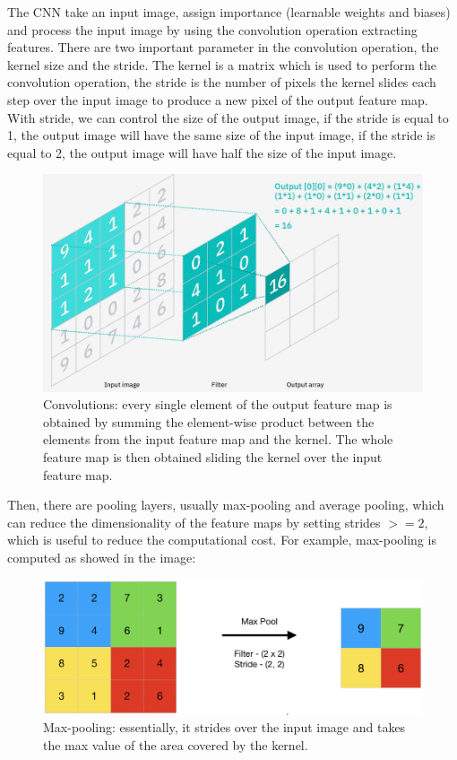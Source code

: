 The CNN take an input image, assign importance (learnable weights and biases) and process the input image by using the convolution operation extracting features.
There are two important parameter in the convolution operation, the kernel size and the stride.
The kernel is a matrix which is used to perform the convolution operation, the stride is the number of pixels the kernel slides each step over the input image to produce a new pixel of the output feature map.
With stride, we can control the size of the output image, if the stride is equal to 1, the output image will have the same size of the input image, if the stride is equal to 2, the output image will have half the size of the input image.
\begin{figure}[H]
    \centering
    \includegraphics[width=\textwidth]{images/2_convolutions}
    \caption{Convolutions: every single element of the output feature map is obtained by summing the element-wise product between the elements from the input feature map and the kernel. The whole feature map is then obtained sliding the kernel over the input feature map.}
    \label{fig:figure-convolutions}
\end{figure}
Then, there are pooling layers, usually max-pooling and average pooling, which can reduce the dimensionality of the feature maps by setting strides $>=2$, which is useful to reduce the computational cost.
For example, max-pooling is computed as showed in the image:
\begin{figure}[H]
    \centering
    \includegraphics[width=\textwidth]{images/2_max_pooling}
    \caption{Max-pooling: essentially, it strides over the input image and takes the max value of the area covered by the kernel.}
    \label{fig:figure-max-pooling}
\end{figure}
